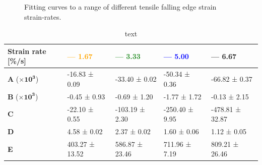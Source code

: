 \begin{figure}[H]
\begin{minipage}[t]{.49\textwidth}
		\vfill
	\end{minipage}
	\caption{Fitting curves to a range of different tensile falling edge strain strain-rates.}
	\label{fig:poly2_strain_relation}
\end{figure}
\begin{table}[H]
	\centering
	\caption{text}
	\label{tab:}
	\begin{tabular}{lllll}
		\hline
		\textbf{Strain rate [\%/s]} & \textcolor{orange}{\textbf{--- 1.67}} & \textcolor{ForestGreen}{\textbf{--- 3.33}} & \textcolor{blue}{\textbf{--- 5.00}} & \textcolor{Rhodamine}{\textbf{--- 6.67}} \\ \hline
		\textbf{A} ($\mathbf{\times 10^3}$) & -16.83 ± 0.09 & -33.40 ± 0.02 & -50.34 ± 0.36 & -66.82 ± 0.37 \\ \hline
		\textbf{B} ($\mathbf{\times 10^3}$) & -0.45 ± 0.93 & -0.69 ± 1.20 & -1.77 ± 1.72 & -0.13 ± 2.15 \\ \hline
		\textbf{C} & -22.10 ± 0.55 & -103.19 ± 2.30 & -250.40 ± 9.95 & -478.81 ± 32.87 \\ \hline
		\textbf{D} & 4.58 ± 0.02 & 2.37 ± 0.02 & 1.60 ± 0.06 & 1.12 ± 0.05 \\ \hline
		\textbf{E} & 403.27 ± 13.52 & 586.87 ± 23.46 & 711.96 ± 7.19 & 809.21 ± 26.46 \\ \hline
	\end{tabular}
\end{table}


